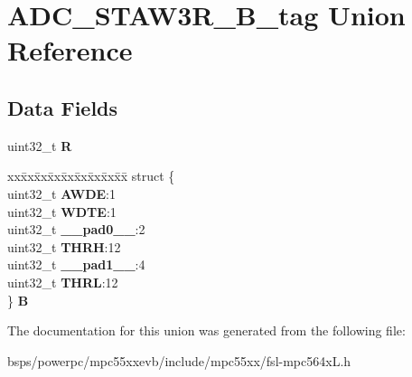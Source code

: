\hypertarget{unionADC__STAW3R__32B__tag}{}\section{A\+D\+C\+\_\+\+S\+T\+A\+W3\+R\+\_\+B\+\_\+tag Union Reference}
\label{unionADC__STAW3R__32B__tag}
\subsection*{Data Fields}
\begin{DoxyCompactItemize}
\item 
\mbox{\label{unionADC__STAW3R__32B__tag_a5aca54ab779c0534f81c15543d1acd63}} 
uint32\+\_\+t {\bfseries R}
\item 
\mbox{\label{unionADC__STAW3R__32B__tag_a0404548d38b5c974e3c5e38a0836d953}} 
\begin{tabbing}
xx\=xx\=xx\=xx\=xx\=xx\=xx\=xx\=xx\=\kill
struct \{\\
\>uint32\_t {\bfseries AWDE}:1\\
\>uint32\_t {\bfseries WDTE}:1\\
\>uint32\_t {\bfseries \_\_pad0\_\_}:2\\
\>uint32\_t {\bfseries THRH}:12\\
\>uint32\_t {\bfseries \_\_pad1\_\_}:4\\
\>uint32\_t {\bfseries THRL}:12\\
\} {\bfseries B}\\

\end{tabbing}\end{DoxyCompactItemize}


The documentation for this union was generated from the following file\+:\begin{DoxyCompactItemize}
\item 
bsps/powerpc/mpc55xxevb/include/mpc55xx/fsl-\/mpc564x\+L.\+h\end{DoxyCompactItemize}
